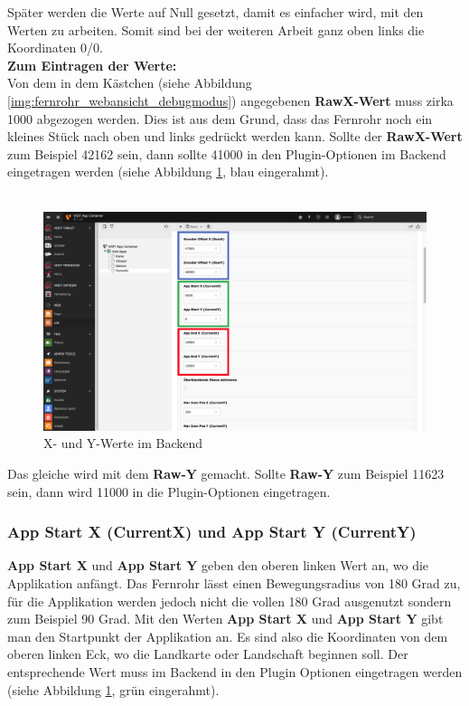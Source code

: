Später werden die Werte auf Null gesetzt, damit es einfacher wird, mit den Werten zu arbeiten. Somit sind bei der weiteren Arbeit ganz oben links die Koordinaten 0/0.\\


\textbf{Zum Eintragen der Werte:}\\

Von dem in dem Kästchen (siehe Abbildung \ref{img:fernrohr_webansicht_debugmodus}) angegebenen \textbf{RawX-Wert} muss zirka 1000 abgezogen werden. Dies ist aus dem Grund, dass das Fernrohr noch ein kleines Stück nach oben und links gedrückt werden kann. Sollte der \textbf{RawX-Wert} zum Beispiel 42162 sein, dann sollte 41000 in den Plugin-Optionen im Backend eingetragen werden (siehe Abbildung \ref{img:x_y_werte}, blau eingerahmt).\\
\\

\begin{figure}[ht!]
\centering
\includegraphics[width=12cm]{Figures/paula/fernrohr/einrichtung_fernrohr/x_y_werte.png}
\caption{X- und Y-Werte im Backend}
\label{img:x_y_werte}
\end{figure}


Das gleiche wird mit dem \textbf{Raw-Y} gemacht. Sollte \textbf{Raw-Y} zum Beispiel 11623 sein, dann wird 11000 in die Plugin-Optionen eingetragen.


\subsubsection{App Start X (CurrentX) und App Start Y (CurrentY)}

\textbf{App Start X} und \textbf{App Start Y} geben den oberen linken Wert an, wo die Applikation anfängt. Das Fernrohr lässt einen Bewegungsradius von 180 Grad zu, für die Applikation werden jedoch nicht die vollen 180 Grad ausgenutzt sondern zum Beispiel 90 Grad. Mit den Werten \textbf{App Start X} und \textbf{App Start Y} gibt man den Startpunkt der Applikation an. Es sind also die Koordinaten von dem oberen linken Eck, wo die Landkarte oder Landschaft beginnen soll. Der entsprechende Wert muss im Backend in den Plugin Optionen eingetragen werden (siehe Abbildung \ref{img:x_y_werte}, grün eingerahmt).

